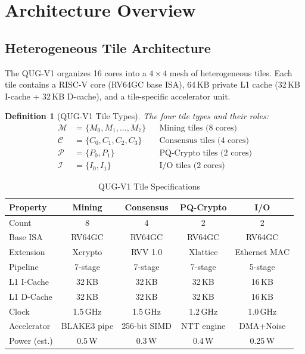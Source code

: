 \documentclass[11pt,a4paper]{article}
\newtheorem{definition}[theorem]{Definition}
\begin{document}
\section{Architecture Overview}
\label{sec:architecture}

\subsection{Heterogeneous Tile Architecture}

The QUG-V1 organizes 16 cores into a $4 \times 4$ mesh of heterogeneous tiles. Each tile contains a RISC-V core (RV64GC base ISA), 64\,KB private L1 cache (32\,KB I-cache + 32\,KB D-cache), and a tile-specific accelerator unit.

\begin{definition}[QUG-V1 Tile Types]
\label{def:tiles}
The four tile types and their roles:
\begin{align}
    \mathcal{M} &= \{M_0, M_1, \ldots, M_7\} && \text{Mining tiles (8 cores)} \\
    \mathcal{C} &= \{C_0, C_1, C_2, C_3\} && \text{Consensus tiles (4 cores)} \\
    \mathcal{P} &= \{P_0, P_1\} && \text{PQ-Crypto tiles (2 cores)} \\
    \mathcal{I} &= \{I_0, I_1\} && \text{I/O tiles (2 cores)}
\end{align}
\end{definition}

\begin{table}[H]
\centering
\caption{QUG-V1 Tile Specifications}
\label{tab:tiles}
\begin{tabular}{@{}lcccc@{}}
\toprule
\textbf{Property} & \textbf{Mining} & \textbf{Consensus} & \textbf{PQ-Crypto} & \textbf{I/O} \\
\midrule
Count & 8 & 4 & 2 & 2 \\
Base ISA & RV64GC & RV64GC & RV64GC & RV64GC \\
Extension & Xcrypto & RVV 1.0 & Xlattice & Ethernet MAC \\
Pipeline & 7-stage & 7-stage & 7-stage & 5-stage \\
L1 I-Cache & 32\,KB & 32\,KB & 32\,KB & 16\,KB \\
L1 D-Cache & 32\,KB & 32\,KB & 32\,KB & 16\,KB \\
Clock & 1.5\,GHz & 1.5\,GHz & 1.2\,GHz & 1.0\,GHz \\
Accelerator & BLAKE3 pipe & 256-bit SIMD & NTT engine & DMA+Noise \\
Power (est.) & 0.5\,W & 0.3\,W & 0.4\,W & 0.25\,W \\
\bottomrule
\end{tabular}
\end{table}
\end{document}
